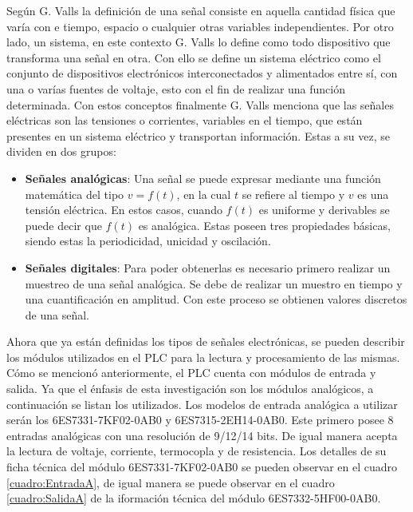 Según G. Valls \cite{valls2011fundamentos} la definición de una señal consiste en aquella cantidad física  que varía con e tiempo, espacio o cualquier otras variables independientes. Por otro lado, un sistema, en este contexto G. Valls \cite{valls2011fundamentos} lo define como todo dispositivo que transforma una señal en otra. Con ello se define un sistema eléctrico como el conjunto de dispositivos electrónicos interconectados y alimentados entre sí, con una o varías fuentes de voltaje, esto con el fin de realizar una función determinada. Con estos conceptos finalmente G. Valls \cite{valls2011fundamentos} menciona que las señales eléctricas son las tensiones o corrientes, variables en el tiempo, que están presentes en un sistema eléctrico y transportan información. Estas a su vez, se dividen en dos grupos:

 \begin{itemize}
  \item \textbf{Señales analógicas}: Una señal se puede expresar mediante una función matemática del tipo $v = f(t)$, en la cual $t$ se refiere al tiempo y $v$ es una tensión eléctrica. En estos casos, cuando $f(t)$ es uniforme y derivables se puede decir que $f(t)$ es analógica. Estas poseen tres propiedades básicas, siendo estas la periodicidad, unicidad y oscilación.
   \item \textbf{Señales digitales}: Para poder obtenerlas es necesario primero realizar un muestreo de una señal analógica. Se debe de realizar un muestro en tiempo y una cuantificación en amplitud. Con este proceso se obtienen valores discretos de una señal.
  \end{itemize}

Ahora que ya están definidas los tipos de señales electrónicas, se pueden describir los módulos utilizados en el PLC para la lectura y procesamiento de las mismas. Cómo se mencionó anteriormente, el PLC cuenta con módulos de entrada y salida. Ya que el énfasis de esta investigación son los módulos analógicos, a continuación se listan los utilizados. Los modelos de entrada analógica a utilizar serán los 6ES7331-7KF02-0AB0 y 6ES7315-2EH14-0AB0. Este primero posee 8 entradas analógicas con una resolución de 9/12/14 bits. De igual manera acepta la lectura de voltaje, corriente, termocopla y de resistencia. Los detalles de su ficha técnica del módulo 6ES7331-7KF02-0AB0 se pueden observar en el cuadro \ref{cuadro:EntradaA}, de igual manera se puede observar en el cuadro \ref{cuadro:SalidaA}
de la iformación técnica del módulo 6ES7332-5HF00-0AB0.

